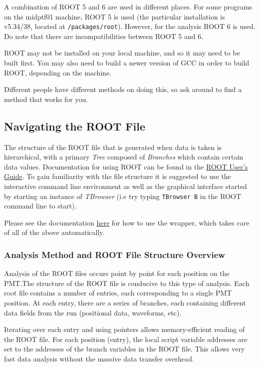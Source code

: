 \documentclass[twoside,letterpaper]{refart}
\begin{document}
A combination of ROOT 5 and 6 are used in different places. For some programs on the midptf01 machine, ROOT 5 is used (the particular installation is v5.34/38, located at \texttt{/packages/root}). However, for the analysis ROOT 6 is used. Do note that there are incompatibilities between ROOT 5 and 6.

ROOT may not be installed on your local machine, and so it may need to be built first. You may also need to build a newer version of GCC in order to build ROOT, depending on the machine.
	
Different people have different methods on doing this, so ask around to find a method that works for you.

\subsection{Navigating the ROOT File}

The structure of the ROOT file that is generated when data is taken is hierarchical, with a primary \emph{Tree} composed of \emph{Branches} which contain certain data values. Documentation for using ROOT can be found in the \href{https://root.cern.ch/guides/users-guide}{ROOT User's Guide}. To gain familiarity with the file structure it is suggested to use the interactive command line environment as well as the graphical interface started by starting an instance of \emph{TBrowser} (i.e try typing \texttt{TBrowser B} in the ROOT command line to start).

Please see the documentation \href{https://bitbucket.org/ttriumfdaq/ptf-analysis-2}{here} for how to use the wrapper, which takes care of all of the above automatically.

\subsubsection{Analysis Method and ROOT File Structure Overview}

Analysis of the ROOT files occurs point by point for each position on the PMT.\@ The structure of the ROOT file is conducive to this type of analysis. Each root file contains a number of entries, each corresponding to a single PMT position. At each entry, there are a series of branches, each containing different data fields from the run (positional data, waveforms, etc).

Iterating over each entry and using pointers allows memory-efficient reading of the ROOT file. For each position (entry), the local script variable addresses are set to the addresses of the branch variables in the ROOT file. This allows very fast data analysis without the massive data transfer overhead.
\end{document}
